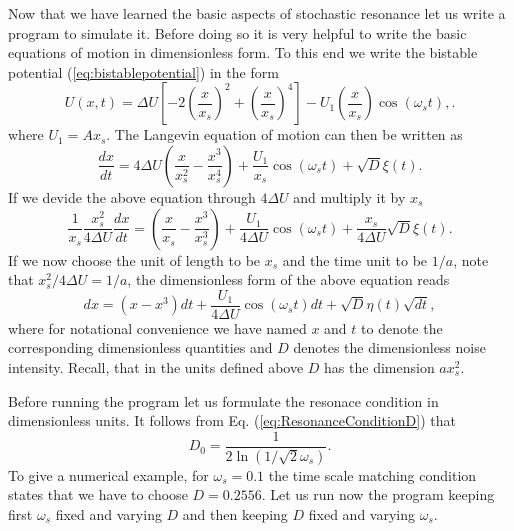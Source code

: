 Now that we have learned the basic aspects of stochastic resonance let us 
write a program to simulate it. Before doing so it is very helpful to write
the basic equations of motion in dimensionless form. To this end we write
the bistable potential (\ref{eq:bistablepotential}) in the form
\begin{equation}
  \label{eq:bistabledimless}
  U(x,t) = \Delta U \left[ -2\left( \frac{x}{x_s} \right)^2 
                           + \left( \frac{x}{x_s} \right)^4 \right] - 
                 U_1 \left(\frac{x}{x_s} \right) \cos(\omega_s t),.
\end{equation}
where $U_1 = A x_s$. The Langevin equation of motion can then be written as
\begin{equation}
  \label{eq:langevindimless1}
  \frac{dx}{dt} = 4 \Delta U \left( \frac{x}{x_s^2} - 
                   \frac{x^3}{x_s^4} \right)
                  + \frac{U_1}{x_s} \cos(\omega_s t)
                  + \sqrt{D} \xi(t).
\end{equation}
If we devide the above equation through $4 \Delta U$ and multiply it by $x_s$
\begin{equation}
  \label{eq:langevindimless2}
  \frac{1}{x_s} \frac{x_s^2}{4 \Delta U} \frac{dx}{dt} 
 =  \left( \frac{x}{x_s} - 
                   \frac{x^3}{x_s^3} \right)
                  + \frac{U_1}{ 4 \Delta U } \cos(\omega_s t)
                  + \frac{x_s}{4 \Delta U}\sqrt{D} \xi(t).
\end{equation}
If we now choose the unit of length to be $x_s$ and the time unit to be
$1/a$, note that $x_s^2/4 \Delta U = 1/a$, the dimensionless form of the above
equation reads
\begin{equation}
  \label{eq:langevindimless3}
  dx 
 =  \left( x - 
              x^3 \right)dt 
                  + \frac{U_1}{ 4 \Delta U} \cos(\omega_s t)dt
                  + \sqrt{D} \eta(t) \sqrt{dt},
\end{equation}
where for notational convenience we have named $x$ and $t$ to denote the 
corresponding dimensionless quantities and $D$ denotes the dimensionless
noise intensity. Recall, that in the units defined above $D$ has the dimension
$a x_s^2$.


Before running the program let us formulate the resonace condition in
dimensionless units. It follows from Eq. (\ref{eq:ResonanceConditionD}) that
\begin{equation}
  \label{eq:ResonanceConditionDless}
  D_0= \frac{1}{2 \ln (1/\sqrt{2} \omega_s)}.
\end{equation}
To give a numerical example, for $\omega_s= 0.1$ the  time scale matching
condition states that we have to choose $D= 0.2556$. Let us run now the
program keeping first $\omega_s$ fixed and varying $D$ and then keeping $D$
fixed and varying $\omega_s$.



